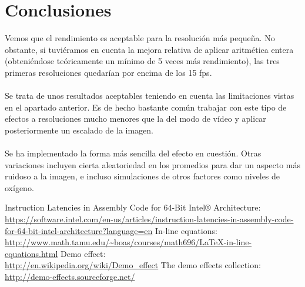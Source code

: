 \documentclass[a4,12pt]{article}
\begin{document}
\section{Conclusiones}

Vemos que el rendimiento es aceptable para la resolución más pequeña. No obstante, si tuviéramos en cuenta la mejora relativa de aplicar aritmética entera (obteniéndose teóricamente un mínimo de 5 veces más rendimiento), las tres primeras resoluciones quedarían por encima de los 15 fps. \\ \\
Se trata de unos resultados aceptables teniendo en cuenta las limitaciones vistas en el apartado anterior. Es de hecho bastante común trabajar con este tipo de efectos a resoluciones mucho menores que la del modo de vídeo y aplicar posteriormente un escalado de la imagen.\cite{democol} \\ \\
Se ha implementado la forma más sencilla del efecto en cuestión. Otras variaciones incluyen cierta aleatoriedad en los promedios para dar un aspecto más ruidoso a la imagen, e incluso simulaciones de otros factores como niveles de oxígeno.

\newpage

\begin{thebibliography}{99}
 Instruction Latencies in Assembly Code for 64-Bit Intel® Architecture:\\ \url{https://software.intel.com/en-us/articles/instruction-latencies-in-assembly-code-for-64-bit-intel-architecture?language=en}
 In-line equations:\\ \url{http://www.math.tamu.edu/~boas/courses/math696/LaTeX-in-line-equations.html}
 Demo effect: \\ \url{http://en.wikipedia.org/wiki/Demo_effect}
 The demo effects collection: \\ \url{http://demo-effects.sourceforge.net/}

\end{thebibliography}
\end{document}
